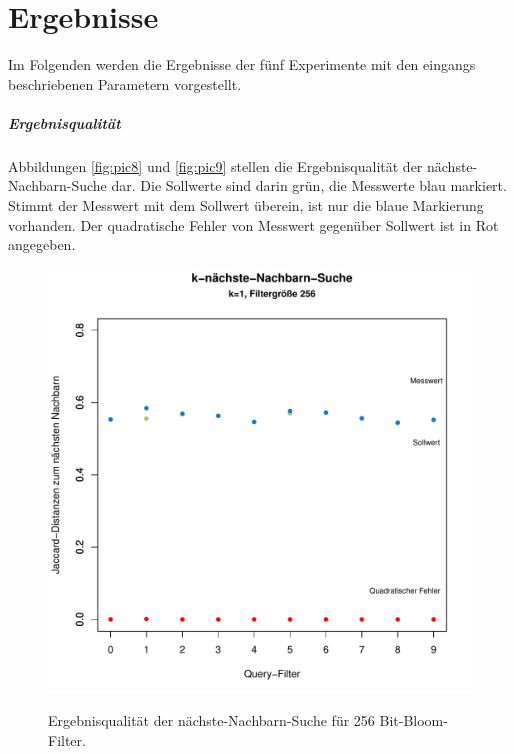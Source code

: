 \section{Ergebnisse}\label{sec:ergebnisse}
Im Folgenden werden die Ergebnisse der fünf Experimente mit den eingangs beschriebenen Parametern vorgestellt. 
\subparagraph*{Ergebnisqualität}
Abbildungen \ref{fig:pic8} und \ref{fig:pic9} stellen die Ergebnisqualität der nächste-Nachbarn-Suche dar. Die Sollwerte sind darin grün, die Messwerte blau markiert. Stimmt der Messwert mit dem Sollwert überein, ist nur die blaue Markierung vorhanden. Der quadratische Fehler von Messwert gegenüber Sollwert ist in Rot angegeben. 
\begin{figure}[hpbt]
	\centering
 	\includegraphics[scale=0.7]{pictures/nn_256.pdf}\\
  	\caption[Ergebnisqualität der nächste-Nachbarn-Suche für 256 Bit-Bloom-Filter]{Ergebnisqualität der nächste-Nachbarn-Suche für 256 Bit-Bloom-Filter.}\label{fig:pic7}

\end{figure}
